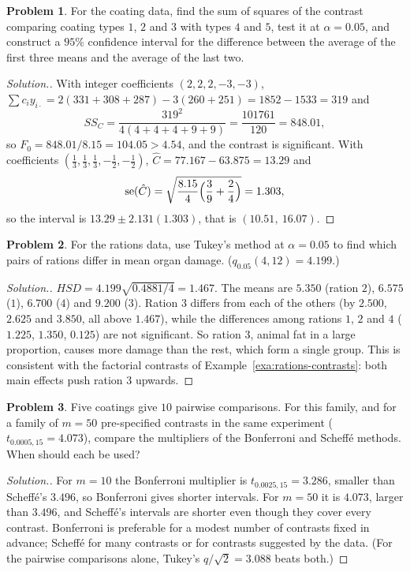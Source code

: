 \documentclass[11pt,a4paper]{article}
\numberwithin{equation}{section}
\theoremstyle{definition}
\newtheorem{problemx}{Problem}[subsection]
\newenvironment{problem}{\begin{problemx}}{\end{problemx}}
\newenvironment{solution}
  {\renewcommand{\qedsymbol}{}\begin{proof}[\textit{Solution}.]}
  {\end{proof}}
\begin{document}
\begin{problem}
For the coating data, find the sum of squares of the contrast comparing coating types $1$, $2$ and $3$ with types $4$ and $5$, test it at $\alpha = 0.05$, and
construct a $95\%$ confidence interval for the difference between the average of the first three means and the average of the last two.
\end{problem}

\begin{solution}
With integer coefficients $(2, 2, 2, -3, -3)$, $\sum c_iy_{i\cdot} = 2(331 + 308 + 287) - 3(260 + 251) = 1852 - 1533 = 319$ and
\[
SS_C = \frac{319^2}{4(4 + 4 + 4 + 9 + 9)} = \frac{101761}{120} = 848.01 ,
\]
so $F_0 = 848.01/8.15 = 104.05 > 4.54$, and the contrast is significant. With coefficients $(\frac13, \frac13, \frac13, -\frac12, -\frac12)$, $\hat C = 77.167 - 63.875 = 13.29$ and
\[
\operatorname{se}(\hat C) = \sqrt{\frac{8.15}{4}\Bigl(\frac39 + \frac24\Bigr)} = 1.303 ,
\]
so the interval is $13.29 \pm 2.131(1.303)$, that is $(10.51,\ 16.07)$.
\end{solution}

\begin{problem}
For the rations data, use Tukey's method at $\alpha = 0.05$ to find which pairs of rations differ in mean organ damage. ($q_{0.05}(4, 12) = 4.199$.)
\end{problem}

\begin{solution}
$HSD = 4.199\sqrt{0.4881/4} = 1.467$. The means are $5.350$ (ration $2$), $6.575$ ($1$), $6.700$ ($4$) and $9.200$ ($3$). Ration $3$ differs from each of the others (by
$2.500$, $2.625$ and $3.850$, all above $1.467$), while the differences among rations $1$, $2$ and $4$ ($1.225$, $1.350$, $0.125$) are not significant. So ration $3$,
animal fat in a large proportion, causes more damage than the rest, which form a single group. This is consistent with the factorial
contrasts of Example~\ref{exa:rations-contrasts}: both main effects push ration $3$ upwards.
\end{solution}

\begin{problem}
Five coatings give $10$ pairwise comparisons. For this family, and for a family of $m = 50$ pre-specified contrasts in the same experiment
($t_{0.0005,15} = 4.073$), compare the multipliers of the Bonferroni and Scheff\'e methods. When should each be used?
\end{problem}

\begin{solution}
For $m = 10$ the Bonferroni multiplier is $t_{0.0025,15} = 3.286$, smaller than Scheff\'e's $3.496$, so Bonferroni gives shorter intervals. For $m = 50$ it is $4.073$, larger than
$3.496$, and Scheff\'e's intervals are shorter even though they cover every contrast. Bonferroni is preferable for a modest number of contrasts fixed in
advance; Scheff\'e for many contrasts or for contrasts suggested by the data. (For the pairwise comparisons alone, Tukey's $q/\sqrt2 = 3.088$ beats both.)
\end{solution}
\end{document}
